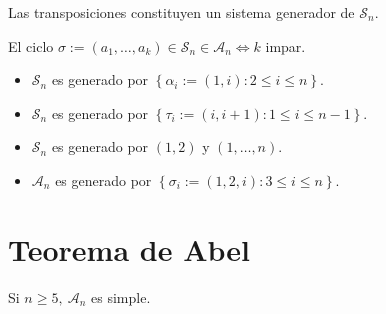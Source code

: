     \begin{lema}
        Las transposiciones constituyen un sistema generador de $\mathcal{S}_n$.
    \end{lema}

    \begin{prop}
        El ciclo $\sigma := \left( a_1, \ldots, a_k \right) \in \mathcal{S}_n \in \mathcal{A}_n \Leftrightarrow k$ impar.
    \end{prop}

    \begin{prop}
        \begin{itemize}
        \item $\mathcal{S}_n$ es generado por $\left\{ \alpha_i := \left( 1, i \right): 2 \le i \le n \right\}$.
        \item $\mathcal{S}_n$ es generado por $\left\{ \tau_i := \left( i, i+1 \right) : 1 \le i \le n-1 \right\}$.
        \item $\mathcal{S}_n$ es generado por $\left( 1, 2 \right)$ y $\left( 1, \ldots, n \right)$.
        \item $\mathcal{A}_n$ es generado por $\left\{ \sigma_i := \left( 1, 2, i \right) : 3 \le i \le n \right\}$.
        \end{itemize} 
    \end{prop}

\section{Teorema de Abel}
    \begin{theo}[De Abel]
        Si $n \ge 5,\ \mathcal{A}_n$ es simple.
    \end{theo}

